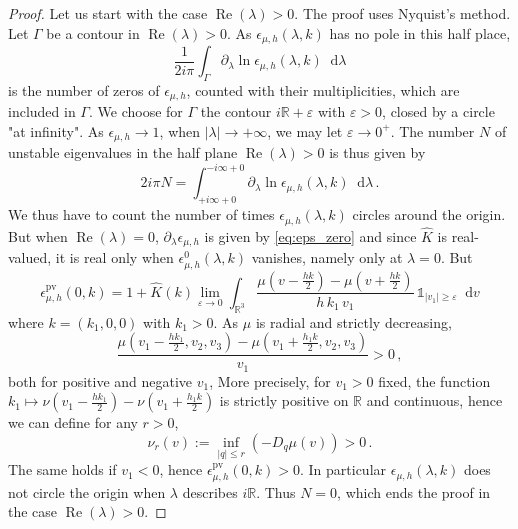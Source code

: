 \documentclass[a4paper,12pt]{amsart} %
\theoremstyle{plain}
\theoremstyle{definition}
\newcommand		{\RR}		{\mathbb R}			%
\newcommand		{\R}		{\RR}
\newcommand		{\Rd}		{\R^3}
\newcommand		{\lt}			{\left}				%
\newcommand		{\rt}			{\right}			%
\renewcommand	{\(}			{\lt(}
\renewcommand	{\)}			{\rt)}
\newcommand		{\set}[1]		{\lt\{#1\rt\}}
\newcommand		{\n}[1]			{\lt\lvert{#1}\rt\rvert}	%
\newcommand		{\indic}	{\mathds{1}}		%
\renewcommand		{\d}		{\mathop{}\!\mathrm{d}}		%
\DeclareMathOperator{\re}		{Re}				%
\renewcommand	{\Re}[1]		{\re\!\( #1 \)}		%
\newcommand		{\intd}			{\int_{\Rd}}
\newcommand		{\eps}			{\varepsilon}
\newcommand	{\h}			{h}
\begin{document}
	\begin{proof}
		Let us start with the case $\Re \lambda >0$. The proof uses Nyquist's method. Let $\Gamma$ be a contour in $\Re \lambda > 0$. As $\epsilon_{\mu,\h}(\lambda,k)$ has no pole in this half place,
		\begin{equation*}
			\frac{1}{2 i \pi} \int_\Gamma \partial_\lambda \ln \epsilon_{\mu,\h}(\lambda,k) \d\lambda
		\end{equation*}
		is the number of zeros of $\epsilon_{\mu,\h}$, counted with their multiplicities, which are included in $\Gamma$. We choose for $\Gamma$ the contour $i \R + \eps$ with $\eps > 0$, closed by a circle "at infinity". As $\epsilon_{\mu,\h} \to 1$, when $\n{\lambda} \to + \infty$, we may let $\eps \to 0^+$. The number $N$ of unstable eigenvalues in the half plane $\Re \lambda > 0$ is thus given by
		\begin{equation*}
			2 i \pi N = \int_{+ i \infty + 0}^{- i \infty + 0} \partial_\lambda \ln \epsilon_{\mu,\h}(\lambda,k) \d\lambda \, .
		\end{equation*}
		We thus have to count the number of times $\epsilon_{\mu,\h}(\lambda,k)$ circles around the origin.
		But when $\Re{\lambda} = 0$, $\partial_\lambda \epsilon_{\mu,\h}$ is given by \eqref{eq:eps_zero} and since $\widehat{K}$ is real-valued, it is real only when $\epsilon_{\mu,\h}^0(\lambda,k)$ vanishes, namely only at $\lambda = 0$. But
		\begin{equation*}
			\epsilon_{\mu,\h}^\text{pv}(0,k) = 1 + \widehat{K}(k) \lim_{\eps\to 0}\intd \frac{ \mu(v-\frac{hk}{2}) - \mu(v+\frac{h k}{2})}{h\,k_1\,v_1}\,\indic_{\n{v_1}\geq \eps}\d v
		\end{equation*}
		where $k = (k_1,0,0)$ with $k_1>0$. As $\mu$ is radial and strictly decreasing,
		\begin{equation*}
			\frac{\mu(v_1-\tfrac{hk_1}{2},v_2,v_3) - \mu(v_1+\tfrac{h_1k}{2},v_2,v_3)}{v_1} > 0 \, ,
		\end{equation*}
		both for positive and negative $v_1$,
		More precisely, for $v_1>0$ fixed, the function $k_1\mapsto \nu(v_1-\tfrac{hk_1}{2}) - \nu(v_1+\tfrac{h_1k}{2})$ is strictly positive on $\R$ and continuous, hence we can define for any $r>0$,
		\begin{equation}\label{eq:bound_convexity_mu}
			\nu_r(v) := \inf_{\n{q}\leq r} (- D_q\mu(v)) > 0 \, .
		\end{equation}
		The same holds if $v_1<0$, hence $\epsilon_{\mu,\h}^\text{pv}(0,k) > 0$. In particular $\epsilon_{\mu,\h}(\lambda,k)$ does not circle the origin when $\lambda$ describes $i \R$. Thus $N = 0$, which ends the proof in the case $\Re \lambda > 0$.
		

\end{proof}
\end{document}
